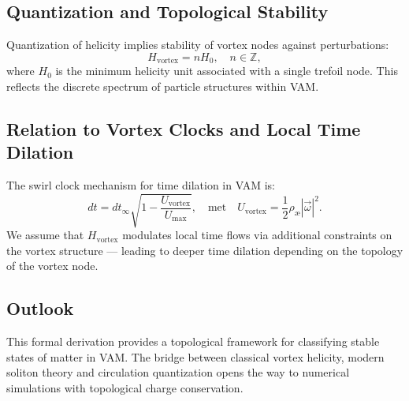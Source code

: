 \subsection{Quantization and Topological Stability}

Quantization of helicity implies stability of vortex nodes against perturbations:
\begin{equation}
    H_\text{vortex} = n H_0, \quad n \in \mathbb{Z},
\end{equation}
where $H_0$ is the minimum helicity unit associated with a single trefoil node. This reflects the discrete spectrum of particle structures within VAM.

\subsection{Relation to Vortex Clocks and Local Time Dilation}

The swirl clock mechanism for time dilation in VAM is:
\begin{equation}
    dt = dt_\infty \sqrt{1 - \frac{U_\text{vortex}}{U_\text{max}}},
    \quad \text{met} \quad
    U_\text{vortex} = \frac{1}{2} \rho_\text{\ae} |\vec{\omega}|^2.
\end{equation}
We assume that $H_\text{vortex}$ modulates local time flows via additional constraints on the vortex structure — leading to deeper time dilation depending on the topology of the vortex node.

\subsection{Outlook}

This formal derivation provides a topological framework for classifying stable states of matter in VAM. The bridge between classical vortex helicity, modern soliton theory and circulation quantization opens the way to numerical simulations with topological charge conservation.